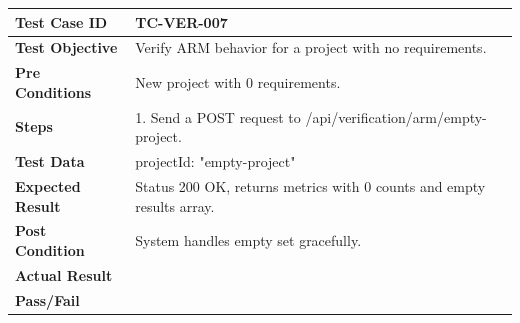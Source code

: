 \begin{longtable}{|p{}|p{}|}
\hline
\textbf{Test Case ID} & TC-VER-007 \\ \hline
\textbf{Test Objective} & Verify ARM behavior for a project with no requirements. \\ \hline
\textbf{Pre Conditions} & New project with 0 requirements. \\ \hline
\textbf{Steps} & 
1. Send a POST request to /api/verification/arm/empty-project. \\ \hline
\textbf{Test Data} & projectId: "empty-project" \\ \hline
\textbf{Expected Result} & Status 200 OK, returns metrics with 0 counts and empty results array. \\ \hline
\textbf{Post Condition} & System handles empty set gracefully. \\ \hline
\textbf{Actual Result} &  \\ \hline
\textbf{Pass/Fail} &  \\ \hline
\end{longtable}
